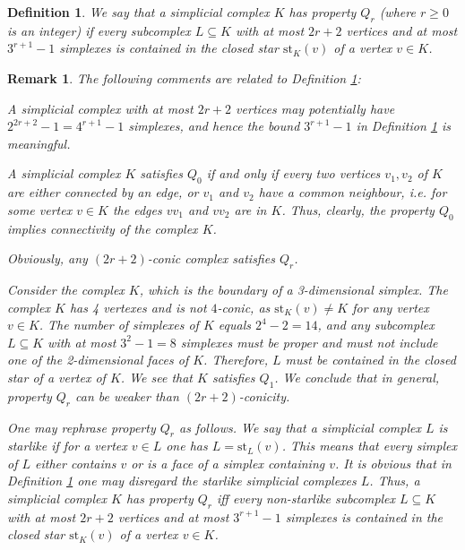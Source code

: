 \documentclass[10pt,a4paper]{amsart}
\newtheorem{remark}[lema]{Remark}
\newtheorem{defi}[lema]{Definition}
\newcommand{\st}{\textrm{st}}
\begin{document}
\begin{defi}\label{def:qr}{\it 
We say that a simplicial complex $K$ has property $Q_r$ (where $r\ge 0$ is an integer)
if every subcomplex $L\subseteq K$ with at most $2r+2$ vertices and at most $3^{r+1}-1$ simplexes is contained in the closed star $\st_K(v)$ of a vertex $v\in K$. }
\end{defi}
\begin{remark}\label{rk1} {\rm The following comments are related to Definition \ref{def:qr}:}
\begin{enumerate}
{\rm 
\item[{(1)}] 
A simplicial complex with at most $2r+2$ vertices may potentially have %
$2^{2r+2}-1=4^{r+1}-1$ simplexes, and hence the bound $3^{r+1}-1$ in Definition \ref{def:qr} is meaningful. 


\item[{(2)}] A simplicial complex $K$ satisfies $Q_0$ if and only if every two vertices $v_1, v_2$ of $K$ are 
either connected by an edge, or $v_1$ and $v_2$ have a common neighbour, i.e. for some vertex $v\in K$ the edges $vv_1$ and $vv_2$ are in $K$. 
Thus, clearly, the property $Q_0$ implies connectivity of the complex $K$. 

\item[{(3)}] Obviously, any $(2r+2)$-conic complex satisfies $Q_r$. 

\item[{(4)}] Consider the complex $K$, which is the boundary of a 3-dimensional simplex. 
The complex $K$ has 4 vertexes and is not $4$-conic, as $\st_K(v)\not= K$ for any vertex $v\in K$. 
The number of simplexes of $K$ equals $2^4-2=14$, and 
any subcomplex $L\subseteq K$ with at most $3^2-1=8$ simplexes must be proper and must not include one of the 2-dimensional faces of $K$. Therefore,
 $L$ must be contained in the closed star of a vertex of $K$. We see that $K$
 satisfies $Q_1$. 
 We conclude that  {\it in general, property
$Q_r$ can be weaker than $(2r+2)$-conicity. }

\item[{(5)}] One may rephrase property $Q_r$ as follows. We say that a simplicial complex $L$ is starlike if for a vertex $v\in L$ one has 
$L= \st_L(v)$. This means that every simplex of $L$ either contains $v$ or is a face of a simplex containing $v$. 
It is obvious that in Definition \ref{def:qr} one may disregard the starlike simplicial complexes $L$. Thus, a simplicial complex $K$ has property $Q_r$ 
iff every non-starlike subcomplex $L\subseteq K$ with at most $2r+2$ vertices and at most $3^{r+1}-1$ simplexes is contained in the closed star $\st_K(v)$ of a vertex $v\in K$.
}
\end{enumerate}
\end{remark}
\end{document}
